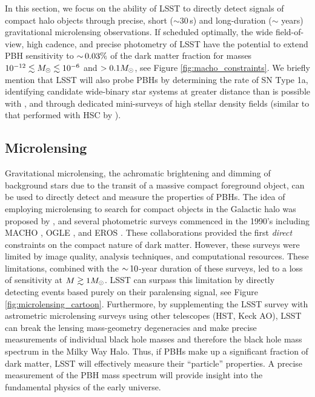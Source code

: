 In this section, we focus on the ability of LSST to directly detect signals of compact halo objects through precise, short ($\sim30\,$s) and long-duration ($\sim$ years) gravitational microlensing observations.
If scheduled optimally, the wide field-of-view, high cadence, and precise photometry of LSST have the potential to extend PBH sensitivity to $ {\sim}\, 0.03\%$ of the dark matter fraction for masses $10^{-12}\lesssim M_\odot \lesssim 10^{-6}$ and $>0.1M_\odot$, see Figure \ref{fig:macho_constraints}.
We briefly mention that LSST will also probe PBHs by determining the rate of SN Type 1a, identifying candidate wide-binary star systems at greater distance than is possible with \Gaia, and through dedicated mini-surveys of high stellar density fields (similar to that performed with HSC by \citealt{1701.02151}).


\subsection{Microlensing}
\label{sec:microlensing}

Gravitational microlensing, the achromatic brightening and dimming of background stars due to the transit of a massive compact foreground object, can be used to directly detect and measure the properties of PBHs.
The idea of employing microlensing to search for compact objects in the Galactic halo was proposed by \citet{1986ApJ...304....1P}, and several photometric surveys commenced in the 1990's including MACHO \citep{1992ASPC...34..193A}, OGLE \citep{1992AcA....42..253U}, and EROS \citep{1993Msngr..72...20A}.
These collaborations provided the first \emph{direct} constraints on the compact nature of dark matter. 
However, these surveys were limited by image quality, analysis techniques, and computational resources.
These limitations, combined with the $ {\sim}\,10$-year duration of these surveys, led to a loss of sensitivity at $M \gtrsim 1 M_\odot$.
LSST can surpass this limitation by directly detecting events based purely on their paralensing signal, see Figure \ref{fig:microlensing_cartoon}.
Furthermore, by supplementing the LSST survey with astrometric microlensing surveys using other telescopes (HST, Keck AO), LSST can break the lensing mass-geometry degeneracies and make precise measurements of individual black hole masses and therefore the black hole mass spectrum in the Milky Way Halo.
Thus, if PBHs make up a significant fraction of dark matter, LSST will effectively measure their ``particle'' properties. 
A precise measurement of the PBH mass spectrum will provide insight into the fundamental physics of the early universe.

